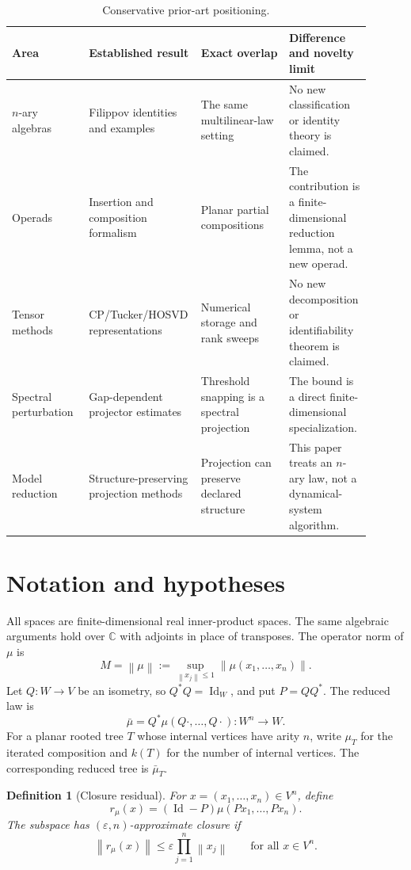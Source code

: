 \documentclass[11pt]{article}
\newtheorem{definition}[theorem]{Definition}
\newcommand{\norm}[1]{\left\lVert #1\right\rVert}
\newcommand{\id}{\operatorname{Id}}
\begin{document}
\begin{table}[t]
\centering
\small
\caption{Conservative prior-art positioning.}
\label{tab:prior-art}
\begin{tabular}{p{0.21\linewidth}p{0.24\linewidth}p{0.24\linewidth}p{0.21\linewidth}}
\toprule
Area & Established result & Exact overlap & Difference and novelty limit \\
\midrule
$n$-ary algebras & Filippov identities and examples & The same multilinear-law setting & No new classification or identity theory is claimed. \\
Operads & Insertion and composition formalism & Planar partial compositions & The contribution is a finite-dimensional reduction lemma, not a new operad. \\
Tensor methods & CP/Tucker/HOSVD representations & Numerical storage and rank sweeps & No new decomposition or identifiability theorem is claimed. \\
Spectral perturbation & Gap-dependent projector estimates & Threshold snapping is a spectral projection & The bound is a direct finite-dimensional specialization. \\
Model reduction & Structure-preserving projection methods & Projection can preserve declared structure & This paper treats an $n$-ary law, not a dynamical-system algorithm. \\
\bottomrule
\end{tabular}
\end{table}

\section{Notation and hypotheses}

All spaces are finite-dimensional real inner-product spaces. The same algebraic arguments hold over $\mathbb C$ with adjoints in place of transposes. The operator norm of $\mu$ is
\[
    M=\norm{\mu}:=\sup_{\norm{x_j}\leq 1}\norm{\mu(x_1,\ldots,x_n)}.
\]
Let $Q:W\to V$ be an isometry, so $Q^*Q=\id_W$, and put $P=QQ^*$. The reduced law is
\[
    \bar\mu=Q^*\mu(Q\cdot,\ldots,Q\cdot):W^n\to W.
\]
For a planar rooted tree $T$ whose internal vertices have arity $n$, write $\mu_T$ for the iterated composition and $k(T)$ for the number of internal vertices. The corresponding reduced tree is $\bar\mu_T$.

\begin{definition}[Closure residual]
For $x=(x_1,\ldots,x_n)\in V^n$, define
\[
    r_\mu(x)=(\id-P)\mu(Px_1,\ldots,Px_n).
\]
The subspace has $(\varepsilon,n)$-approximate closure if
\[
    \norm{r_\mu(x)}\leq \varepsilon\prod_{j=1}^n\norm{x_j}
    \qquad\text{for all }x\in V^n.
\]
\end{definition}
\end{document}
